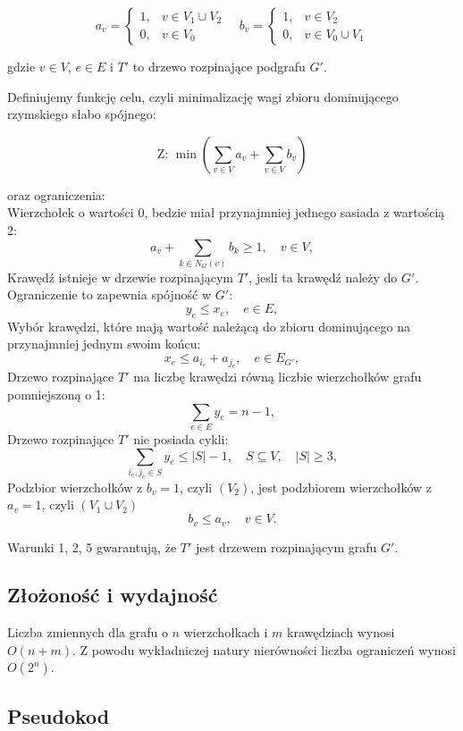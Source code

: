 \[
a_v =
\begin{cases}
1, & v \in V_1 \cup V_2 \\
0, & v \in V_0
\end{cases}
\quad
b_v =
\begin{cases}
1, & v \in V_2 \\
0, & v \in V_0 \cup V_1
\end{cases}
\]

gdzie \( v \in V \), \( e \in E \) i \( T' \) to drzewo rozpinające podgrafu \( G' \).

Definiujemy funkcję celu, czyli minimalizację wagi zbioru dominującego rzymskiego słabo spójnego:

\[
\text{Z: } \min \left( \sum_{v \in V} a_v + \sum_{v \in V} b_v \right)
\]

oraz ograniczenia:\\
Wierzchołek o wartości 0, bedzie miał przynajmniej jednego sasiada z wartością 2:
\[
    a_v + \sum_{k \in N_G(v)} b_k \geq 1, \quad v \in V, \tag{1}
\]
Krawędź istnieje w drzewie rozpinającym \( T' \), jesli ta krawędź należy do \( G' \). Ograniczenie to zapewnia spójność w \( G' \):
\[
    y_e \leq x_e, \quad e \in E, \tag{2}
\]
Wybór krawędzi, które mają  wartość należącą do zbioru dominującego na przynajmniej jednym swoim końcu:
\[
    x_e \leq a_{i_e} + a_{j_e}, \quad e \in E_{G'}, \tag{3}
\]
Drzewo rozpinające \( T' \) ma liczbę krawędzi równą liczbie wierzchołków grafu pomniejszoną o 1:
\[
    \sum_{e \in E} y_e = n - 1, \tag{4}
\]
Drzewo rozpinające \( T' \) nie posiada cykli:
\[
    \sum_{i_e, j_e \in S} y_e \leq |S| - 1, \quad S \subseteq V, \quad |S| \geq 3, \tag{5}
\]
Podzbior wierzchołków z $b_v = 1$, czyli $(V_2)$, jest podzbiorem wierzchołków z $a_v = 1$, czyli $(V_1 \cup V_2)$
\[
    b_v \leq a_v, \quad v \in V. \tag{6}
\]

Warunki 1, 2, 5 gwarantują, że \( T' \) jest drzewem rozpinającym grafu \( G' \).

\subsection{Złożoność i wydajność}

Liczba zmiennych dla grafu o $n$ wierzchołkach i $m$ krawędziach wynosi $O(n+m)$.
Z powodu wykładniczej natury nierówności liczba ograniczeń wynosi $O(2^n)$.

\subsection{Pseudokod}

